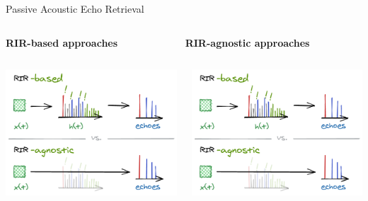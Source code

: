 \begin{frame}[t]{\alert{Passive} Acoustic Echo Retrieval \hfill\faPalette}

        \vspace{.5em}
        \begin{columns}[T,onlytextwidth] %
            \begin{column}{.48\textwidth}
                \textbf{RIR-\alert{based} approaches}
            \end{column}
            \begin{column}{.48\textwidth}
                \textbf{RIR-\alert{agnostic} approaches}
            \end{column}%
        \end{columns}

        \vspace{.5em}
        \begin{columns}[onlytextwidth] %
            \begin{column}{.48\textwidth}
                \includegraphics[trim={0 31em 0 7em},clip,width=.9\textwidth]{./figures/based-agnostic.png}
            \end{column}
            \begin{column}{.48\textwidth}
                \includegraphics[trim={0 0 0 40em},clip,width=.9\textwidth]{./figures/based-agnostic.png}
            \end{column}%
        \end{columns}


\end{frame}
